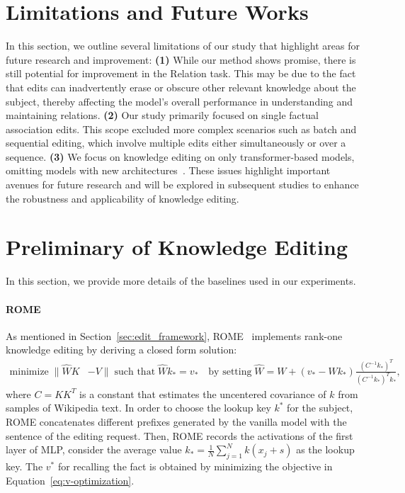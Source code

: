 
\newpage

\section{Limitations and Future Works}
\label{sec:limitations}
In this section, we outline several limitations of our study that highlight areas for future research and improvement:
\textbf{(1)} While our method shows promise, there is still potential for improvement in the Relation task. This may be due to the fact that edits can inadvertently erase or obscure other relevant knowledge about the subject, thereby affecting the model's overall performance in understanding and maintaining relations.
\textbf{(2)} Our study primarily focused on single factual association edits. This scope excluded more complex scenarios such as batch and sequential editing, which involve multiple edits either simultaneously or over a sequence.
\textbf{(3)} We focus on knowledge editing on only transformer-based models, omitting models with new architectures~\citep{gu2023mamba}. 
These issues highlight important avenues for future research and will be explored in subsequent studies to enhance the robustness and applicability of knowledge editing.

\section{Preliminary of Knowledge Editing}
\label{app:prliminary}
In this section, we provide more details of the baselines used in our experiments.
\paragraph{ROME}
As mentioned in Section~\ref{sec:edit_framework}, ROME~\citep{rome} implements rank-one knowledge editing by deriving a closed form solution:
\begin{align}
\text{minimize} \; \lVert \hat{W}K &- V \rVert \; \text{such that} \;  \hat{W}k_* = v_* \quad \text{by setting} \; \hat{W} = W + (v_* - W k_*)\frac{(C^{-1}k_*)^T}{(C^{-1}k_*)^T k_*},
\end{align}
where $C=KK^T$ is a constant that estimates the uncentered covariance of $k$ from samples of Wikipedia text.
In order to choose the lookup key $k^*$ for the subject, ROME concatenates different prefixes generated by the vanilla model with the sentence of the editing request. Then, ROME records the activations of the first layer of MLP, consider the average value $k_* = \frac{1}{N} \sum_{j=1}^N k(x_j + s)$ as the lookup key.
The $v^*$ for recalling the fact is obtained by minimizing the objective in Equation~\ref{eq:v-optimization}.  


